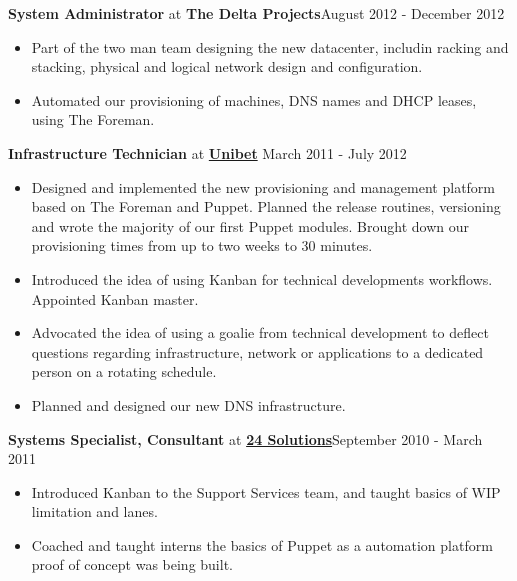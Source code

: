 \documentclass[8pt]{article}
\newenvironment{outerlist}[1][\enskip\textbullet]%
        {\begin{itemize}[#1]}{\end{itemize}%
         \vspace{-.6\baselineskip}}
\newcommand{\blankline}{\quad\pagebreak[2]}
\begin{document}
\textbf{System Administrator} at {\textbf{The Delta Projects}}\hfill {August 2012 - December 2012}
\begin{outerlist}
	\item Part of the two man team designing the new datacenter, includin racking and stacking, physical and logical network design and
		configuration.
	\item Automated our provisioning of machines, DNS names and DHCP leases, using The Foreman. 
\end{outerlist}
\blankline

\textbf{Infrastructure Technician} at \href{http://www.unibet.com}{\textbf{Unibet}}  \hfill {March 2011 - July 2012}
\begin{outerlist}
	 \item Designed and implemented the new provisioning and management platform based on The Foreman and Puppet. Planned the release routines, versioning and wrote the majority of our first Puppet modules. Brought down our provisioning times from up to two weeks to 30 minutes.
	\item Introduced the idea of using Kanban for technical developments workflows. Appointed Kanban master.
	\item Advocated the idea of using a goalie from technical development to deflect questions regarding infrastructure, network or applications to a dedicated person on a rotating schedule.
	\item Planned and designed our new DNS infrastructure.
\end{outerlist}
\blankline

 \textbf{Systems Specialist, Consultant} at \href{http://www.24solutions.se}{\textbf{24 Solutions}}\hfill {September 2010 - March 2011}
\begin{outerlist}
	\item Introduced Kanban to the Support Services team, and taught basics of WIP limitation and lanes.
	\item Coached and taught interns the basics of Puppet as a automation platform proof of concept was being built.
\end{outerlist}
\blankline
\end{document}
